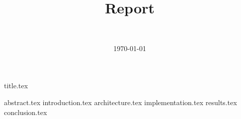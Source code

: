 \documentclass[final]{article}
\title{Report}
\author{~}
\date{\today}
\begin{document}

{title.tex}
\newpage

{abstract.tex}
{introduction.tex}
{architecture.tex}
{implementation.tex}
{results.tex}
{conclusion.tex}


\printbibliography
\end{document}
